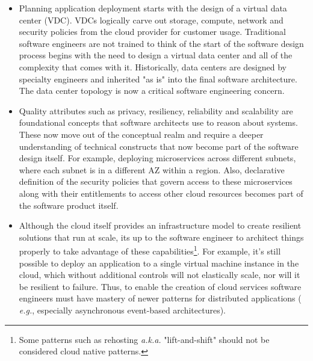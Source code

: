 \documentclass[conference]{IEEEtran}
\begin{document}
\begin{itemize}
	\item  Planning application deployment starts with the design of a virtual data center (VDC). VDCs logically carve out storage, compute, network and security policies from the cloud provider for customer usage. Traditional software engineers are not trained to think of the start of the software design process begins with the need to design a virtual data center and all of the complexity that comes with it.  Historically, data centers are designed by specialty engineers and inherited "as is" into the final software architecture. The data center topology is now a critical software engineering concern. 
	
	\item  Quality attributes such as privacy, resiliency, reliability and scalability are foundational concepts that software architects use to reason about systems.  These now move out of the conceptual realm and require a deeper understanding of technical constructs that now become part of the software design itself.  For example, deploying microservices across different subnets, where each subnet is in a different AZ within a region. Also, declarative definition of  the security policies that govern access to these microservices along with their entitlements to access other cloud resources becomes part of the software product itself. 
	
	\item  Although the cloud itself provides an infrastructure model to create resilient solutions that run at scale, its up to the software engineer to architect things properly to take advantage of these capabilities\footnote{Some patterns such as rehosting\cite{engelsrud2019moving} {\em a.k.a.} "lift-and-shift" should not be considered cloud native patterns.}.  For example, it's still possible to deploy an application to a single virtual machine instance in the cloud, which without additional controls will not elastically scale, nor will it be resilient to failure.  Thus, to enable the creation of cloud services software engineers must have mastery of newer patterns for distributed applications ( {\em e.g.}, especially asynchronous event-based architectures).
	

\end{itemize}
\end{document}

